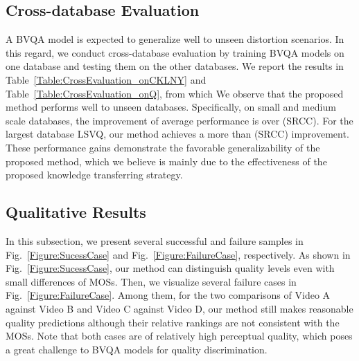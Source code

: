 \documentclass[journal]{IEEEtran}
\begin{document}
{{\subsection{Cross-database Evaluation}\label{subsec:CrossEvaluation}
A BVQA model is expected to generalize well to unseen distortion scenarios. In this regard, we conduct cross-database evaluation by training BVQA models on one database and testing them on the other databases. We report the results in Table~\ref{Table:CrossEvaluation_onCKLNY} and Table~\ref{Table:CrossEvaluation_onQ}, from which We observe that the proposed method performs well to unseen databases. Specifically, on small and medium scale databases, the improvement of average performance is over  (SRCC). For the largest database LSVQ, our method achieves a more than  (SRCC) improvement. These performance gains demonstrate the favorable generalizability of the proposed method, which we believe is mainly due to the effectiveness of the proposed knowledge transferring strategy.



\subsection{Qualitative Results}\label{subsec:QualitativeAnalysis}






In this subsection, we present several successful and failure samples in Fig.~\ref{Figure:SucessCase} and Fig.~\ref{Figure:FailureCase}, respectively. As shown in Fig.~\ref{Figure:SucessCase}, our method can distinguish quality levels even with small differences of MOSs. Then, we visualize several failure cases in Fig.~\ref{Figure:FailureCase}. Among them, for the two comparisons of Video A against Video B and Video C against Video D, our method still makes reasonable quality predictions although their relative rankings are not consistent with the MOSs. Note that both cases are of relatively high perceptual quality, which poses a great challenge to BVQA models for quality discrimination.

}}
\end{document}

